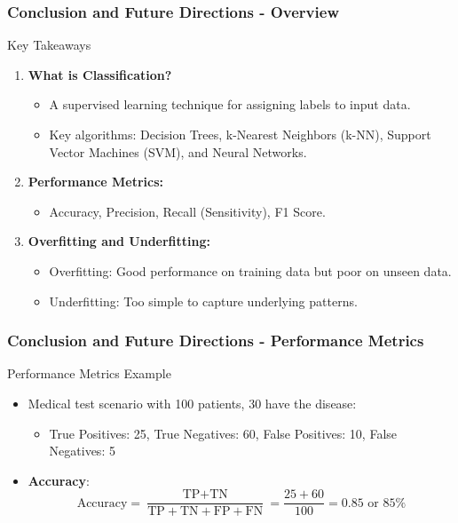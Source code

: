 \documentclass[aspectratio=169]{beamer}
\begin{document}
\begin{frame}[fragile]
    \frametitle{Conclusion and Future Directions - Overview}
    \begin{block}{Key Takeaways}
        \begin{enumerate}
            \item \textbf{What is Classification?} 
            \begin{itemize}
                \item A supervised learning technique for assigning labels to input data.
                \item Key algorithms: Decision Trees, k-Nearest Neighbors (k-NN), Support Vector Machines (SVM), and Neural Networks.
            \end{itemize}
            
            \item \textbf{Performance Metrics:} 
            \begin{itemize}
                \item Accuracy, Precision, Recall (Sensitivity), F1 Score.
            \end{itemize}
            
            \item \textbf{Overfitting and Underfitting:} 
            \begin{itemize}
                \item Overfitting: Good performance on training data but poor on unseen data.
                \item Underfitting: Too simple to capture underlying patterns.
            \end{itemize}
        \end{enumerate}
    \end{block}
\end{frame}

\begin{frame}[fragile]
    \frametitle{Conclusion and Future Directions - Performance Metrics}
    \begin{block}{Performance Metrics Example}
        \begin{itemize}
            \item Medical test scenario with 100 patients, 30 have the disease:
                \begin{itemize}
                    \item True Positives: 25, True Negatives: 60, False Positives: 10, False Negatives: 5
                \end{itemize}
            \item \textbf{Accuracy}:
            \begin{equation}
                \text{Accuracy} = \frac{\text{TP} + \text{TN}}{\text{TP} + \text{TN} + \text{FP} + \text{FN}} = \frac{25 + 60}{100} = 0.85\text{ or } 85\%
            \end{equation}
        \end{itemize}
    \end{block}
\end{frame}
\end{document}
